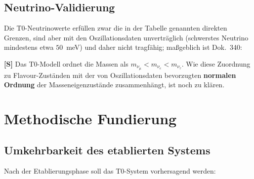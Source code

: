 	\subsection{Neutrino-Validierung}
	\label{subsec:neutrino_validation}
	
	Die T0-Neutrinowerte erfüllen zwar die in der Tabelle genannten direkten Grenzen, sind aber mit den Oszillationsdaten unverträglich (schwerstes Neutrino mindestens etwa $50$~meV) und daher nicht tragfähig; maßgeblich ist Dok.~340:
	
	\begin{table}[H]
		\centering
		\caption{T0-Neutrino-Vorhersagen vs. experimentelle Beschränkungen}
		\label{tab:neutrino_validation}
	\end{table}
	
	\begin{important}
		\textbf{[S]} Das T0-Modell ordnet die Massen als $m_{\nu_\mu} < m_{\nu_e} < m_{\nu_\tau}$. Wie diese Zuordnung zu Flavour-Zuständen mit der von Oszillationsdaten bevorzugten \textbf{normalen Ordnung} der Masseneigenzustände zusammenhängt, ist noch zu klären.
	\end{important}
	
	\section{Methodische Fundierung}
	\label{sec:wissenschaftliche_legitimitaet}
	
	\subsection{Umkehrbarkeit des etablierten Systems}
	\label{subsec:umkehrbarkeit}
	
	Nach der Etablierungsphase soll das T0-System vorhersagend werden:
	
